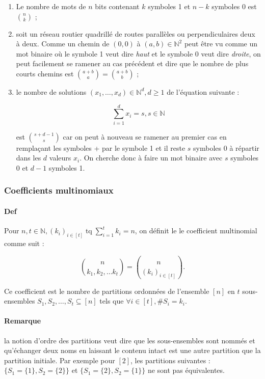 \documentclass{article}
\DeclareMathOperator{\tq}{\text{ tq }}
\begin{document}
			\begin{enumerate}
				\item Le nombre de mots de $n$ bits contenant $k$ symboles 1 et $n-k$ symboles 0 est $\binom nk$ ;
				\item soit un réseau routier quadrillé de routes parallèles ou perpendiculaires deux à deux. Comme un chemin de $(0, 0)$ à $(a, b) \in \mathbb N^2$
				peut être vu comme un mot binaire où le symbole 1 veut dire \textit{haut} et le symbole 0 veut dire \textit{droite}, on peut facilement se ramener au
				cas précédent et dire que le nombre de plus courts chemins est $\binom {a+b}a = \binom {a+b}b$ ;
				\item le nombre de solutions $(x_1, \ldots, x_d) \in \mathbb N^d, d \geq 1$ de l'équation suivante :

				\[\sum_{i=1}^dx_i = s, s \in \mathbb N\]

				est $\binom {s+d-1}s$ car on peut à nouveau se ramener au premier cas en remplaçant les symboles + par le symbole 1 et il reste $s$ symboles 0
				à répartir dans les $d$ valeurs $x_i$. On cherche donc à faire un mot binaire avec $s$ symboles 0 et $d-1$ symboles 1.
			\end{enumerate}

			\subsubsection{Coefficients multinomiaux}

			\paragraph{Def} Pour $n, t \in \mathbb N, (k_i)_{i \in [t]} \tq \sum_{i=1}^tk_i=n$, on définit le le coefficient multinomial comme suit :

			\[\binom {n}{k_1, k_2, \ldots k_t} = \binom n{(k_i)_{i\in[t]}}.\]

			Ce coefficient est le nombre de partitions ordonnées de l'ensemble $[n]$ en $t$ sous-ensembles $S_1, S_2, \ldots, S_t \subseteq [n]$ tels que
			$\forall i \in [t], \#S_i = k_i$.

			\paragraph{Remarque} la notion d'ordre des partitions veut dire que les sous-ensembles sont nommés et qu'échanger deux noms en laissant le contenu
			intact est une autre partition que la partition initiale. Par exemple pour $[2]$, les partitions suivantes : $\{S_1 = \{1\}, S_2 = \{2\}\}$ et
			$\{S_1 = \{2\}, S_2 = \{1\}\}$ ne sont pas équivalentes.
\end{document}
